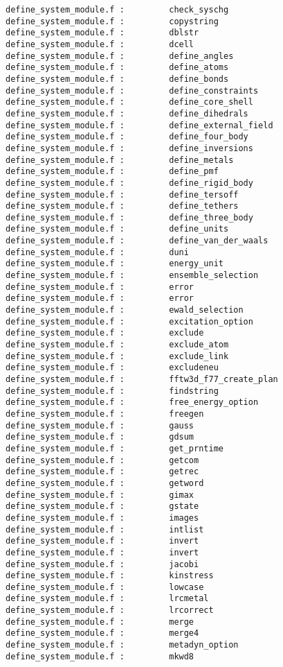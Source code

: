\begin{verbatim}
define_system_module.f :         check_syschg 
define_system_module.f :         copystring 
define_system_module.f :         dblstr
define_system_module.f :         dcell 
define_system_module.f :         define_angles 
define_system_module.f :         define_atoms 
define_system_module.f :         define_bonds 
define_system_module.f :         define_constraints 
define_system_module.f :         define_core_shell 
define_system_module.f :         define_dihedrals 
define_system_module.f :         define_external_field 
define_system_module.f :         define_four_body 
define_system_module.f :         define_inversions 
define_system_module.f :         define_metals 
define_system_module.f :         define_pmf 
define_system_module.f :         define_rigid_body 
define_system_module.f :         define_tersoff 
define_system_module.f :         define_tethers 
define_system_module.f :         define_three_body 
define_system_module.f :         define_units 
define_system_module.f :         define_van_der_waals 
define_system_module.f :         duni
define_system_module.f :         energy_unit
define_system_module.f :         ensemble_selection 
define_system_module.f :         error 
define_system_module.f :         error 
define_system_module.f :         ewald_selection 
define_system_module.f :         excitation_option 
define_system_module.f :         exclude 
define_system_module.f :         exclude_atom 
define_system_module.f :         exclude_link 
define_system_module.f :         excludeneu 
define_system_module.f :         fftw3d_f77_create_plan 
define_system_module.f :         findstring
define_system_module.f :         free_energy_option 
define_system_module.f :         freegen 
define_system_module.f :         gauss 
define_system_module.f :         gdsum 
define_system_module.f :         get_prntime 
define_system_module.f :         getcom 
define_system_module.f :         getrec 
define_system_module.f :         getword 
define_system_module.f :         gimax 
define_system_module.f :         gstate 
define_system_module.f :         images 
define_system_module.f :         intlist 
define_system_module.f :         invert 
define_system_module.f :         invert 
define_system_module.f :         jacobi 
define_system_module.f :         kinstress 
define_system_module.f :         lowcase 
define_system_module.f :         lrcmetal 
define_system_module.f :         lrcorrect 
define_system_module.f :         merge 
define_system_module.f :         merge4 
define_system_module.f :         metadyn_option 
define_system_module.f :         mkwd8

\end{verbatim}

